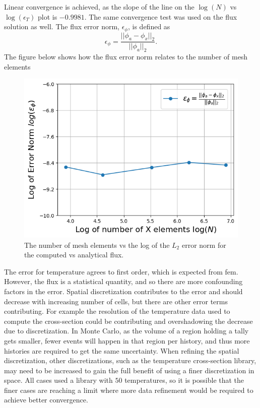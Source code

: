 \documentclass[letterpaper]{mc2023}
\begin{document}
Linear convergence is achieved, as the slope of the line on the $\log(N)$ vs $\log(\epsilon_{T})$ plot is $-0.9981$. The same convergence test
was used on the flux solution as well. The flux error norm, $\epsilon_{\phi}$, is defined as
\begin{equation}
    \epsilon_{\phi} =  \frac{|| \phi_{a} - \phi_{x} ||_{2}}{|| \phi_{a} ||_{2}}.
\end{equation}
The figure below shows how the flux error norm relates to the number of mesh elements
\begin{figure}[H]
    \centering
    \includegraphics[width=0.45\linewidth]{figures/flux_error_norms.png}
    \caption{The number of mesh elements vs the log of the $L_{2}$ error norm for the computed vs analytical flux.}
    \label{fig:flux_error_study}
\end{figure}

The error for temperature agrees to first order, which is expected from \gls{fem}. However, the flux is a statistical quantity, and so there are more
confounding factors in the error. Spatial discretization contributes to the error and should decrease with increasing number of cells, but there are
other error terms contributing. For example the resolution of the temperature data used to compute the cross-section could be contributing and overshadowing
the decrease due to discretization. In Monte Carlo, as the volume of a region holding a tally gets smaller, fewer events will happen in that region
per history, and thus more histories are required to get the same uncertainty. When refining the spatial discretization, other discretizations, such as
the temperature cross-section library, may need to be increased to gain the full benefit of using a finer discretization in space. All cases used a
library with $50$ temperatures, so it is possible that the finer cases are reaching a limit where more data refinement would be required to achieve
better convergence.
\end{document}
